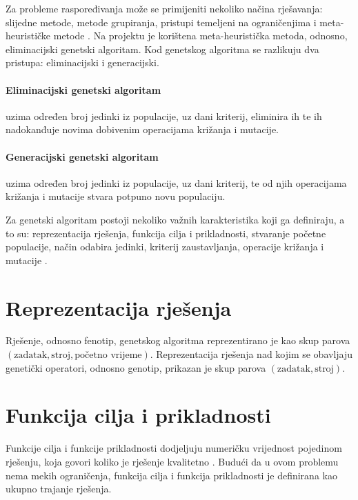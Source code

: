 \documentclass[utf8, seminar, numeric]{fer}
\begin{document}
Za probleme raspoređivanja može se primijeniti nekoliko načina rješavanja: slijedne metode, metode grupiranja, pristupi temeljeni na ograničenjima i meta-heurističke metode \cite{cupicm}. Na projektu je korištena meta-heuristička metoda, odnosno, eliminacijski  genetski algoritam. Kod genetskog algoritma se razlikuju dva pristupa: eliminacijski i generacijski.

\paragraph{Eliminacijski  genetski algoritam} uzima određen broj jedinki iz populacije, uz dani kriterij, eliminira ih te ih nadokanđuje novima dobivenim operacijama križanja i mutacije.

\paragraph{Generacijski  genetski algoritam} uzima određen broj jedinki iz populacije, uz dani kriterij, te od njih operacijama križanja i mutacije stvara potpuno novu populaciju.

Za genetski algoritam postoji nekoliko važnih karakteristika koji ga definiraju, a to su: reprezentacija rješenja, funkcija cilja i prikladnosti, stvaranje početne populacije, način odabira jedinki, kriterij zaustavljanja, operacije križanja i mutacije \cite{hmoea, cupicm}.

\section{Reprezentacija rješenja} 

Rješenje, odnosno fenotip, genetskog algoritma reprezentirano je kao skup parova $(\text{zadatak}, \text{stroj}, \text{početno vrijeme})$. Reprezentacija rješenja nad kojim se obavljaju genetički operatori, odnosno genotip, prikazan je skup parova $(\text{zadatak}, \text{stroj})$.

\section{Funkcija cilja i prikladnosti} \label{sec:fitness}

Funkcije cilja i funkcije prikladnosti dodjeljuju numeričku vrijednost pojedinom rješenju, koja govori koliko je rješenje kvalitetno \cite{hmoea}. Budući da u ovom problemu nema mekih ograničenja, funkcija cilja i funkcija prikladnosti je definirana kao ukupno trajanje rješenja.
\end{document}

